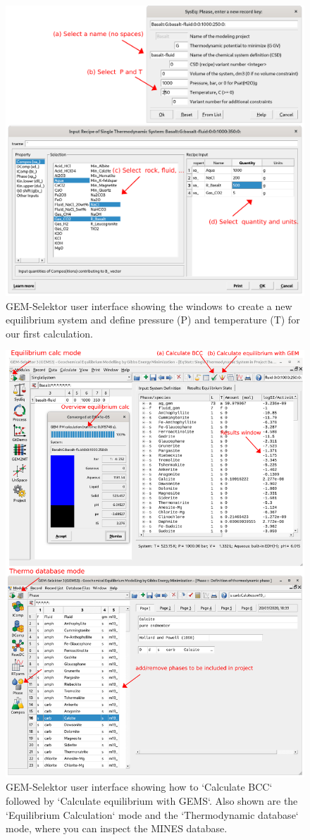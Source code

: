 \documentclass[
]{book}
\begin{document}
\begin{figure}
\includegraphics[width=0.7\linewidth]{figures/module1/fig-8} \caption{GEM-Selektor user interface showing the windows to create a new equilibrium system and define pressure (P) and temperature (T) for our first calculation.}\label{fig:fig-8}
\end{figure}

\begin{figure}
\includegraphics[width=0.7\linewidth]{figures/module1/fig-9} \caption{GEM-Selektor user interface showing how to `Calculate BCC` followed by `Calculate equilibrium with GEMS`. Also shown are the `Equilibrium Calculation` mode and the `Thermodynamic database` mode, where you can inspect the MINES database.}\label{fig:fig-9}
\end{figure}
\end{document}
